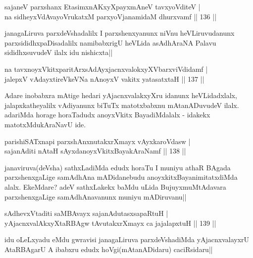 \begin{shl}
sajaneV parxshanx EtasimxnAKxyXpayxmAneV tavxyoVditeV |\\
na sidheyxVdAvayoVrukatxM parxyoVjanamidaM dhurxvamf \hfill || 136 ||
\end{shl}

\begin{artha}
janagaLiruva parxdeVshadalilx I parxshenxyanunx niVnu heVLiruvudanunx parxsididhxpaDisadalilx namibabxrigU heVLida asAdhAraNA Palavu sididhxsuvudeV ilalx idu nishicxta||
\end{artha}

\begin{shl}
na tavxnoyxVkitxparitArxsAdAyxjacnxvalokxyXV\s barxviVdidamf |\\
jalepxV vAdayxtireVkeVNa nAnoyxV vakitx yatasatxtaH \hfill || 137 ||
\end{shl}

\begin{artha}
Adare inobabxra mAtige hedari yAjacnxvalakxyXru idanunx heVLidadxlalx, jalapxkatheyalilx vAdiyanunx biTuTx matotxbabxnu mAtanADuvudeV ilalx. adariMda horage horaTadudx anoyxVkitx BayadiMdalalx - idakekx matotxMdukAraNavU ide.
\end{artha}

\begin{shl}
parishiSATxnapi parxshAnxnutakxrXmayx vAyxkaroVdasw |\\
sajanAditi nAtaH sAyxdanoyxVkitxBayakAraNamf \hfill || 138 ||
\end{shl}

\begin{artha}
janaviruva(deVsha) sathxLadiMda edudx horaTu I muniyu athaR BAgada parxshenxgaLige samAdhAna mADidanebudu anoyxkitxBayanimitatxdiMda alalx. EkeMdare? adeV sathxLakekx baMdu uLida BujuyxmuMtAdavara parxshenxgaLige samAdhAnavanunx muniyu mADiruvanu||
\end{artha}


\begin{shl}
sAdhevxVtaditi saMBAvayx sajanAdutasxsapaRtuH |\\
yAjacnxvalAkxyXtaRBAgw tAvutakxrXmayx ca jajalapxtuH \hfill || 139 ||
\end{shl}

\begin{artha}
idu oLeLxyadu eMdu gwravisi janagaLiruva parxdeVshadiMda yAjacnxvalayxrU AtaRBAgarU A ibabxru edudx hoVgi(mAtanADidaru) caciRsidaru||
\end{artha}

